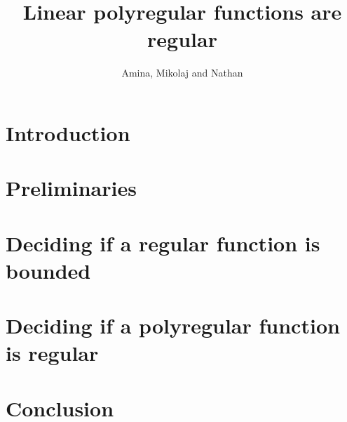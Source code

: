 \documentclass{article}
\begin{document}
 \title{Linear polyregular functions are regular}
 \author{Amina, Mikolaj and Nathan}
 \maketitle


\section{Introduction}
\section{Preliminaries}

\section{Deciding if a regular function is bounded}

\section{Deciding if a polyregular function is regular}

\section{Conclusion}




\end{document}
